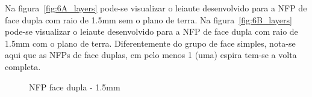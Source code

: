 Na figura~\ref{fig:6A_layers} pode-se visualizar o leiaute desenvolvido para a NFP de face dupla com raio de 1.5mm sem o plano de terra. Na figura~\ref{fig:6B_layers} pode-se visualizar o leiaute desenvolvido para a NFP de face dupla com raio de 1.5mm com o plano de terra. Diferentemente do grupo de face simples, nota-se aqui que as NFPs de face duplas, em pelo menos 1 (uma) espira tem-se a volta completa. 
\begin{figure}[htb!]
	\centering
 	\caption{NFP face dupla - 1.5mm}
\end{figure}

